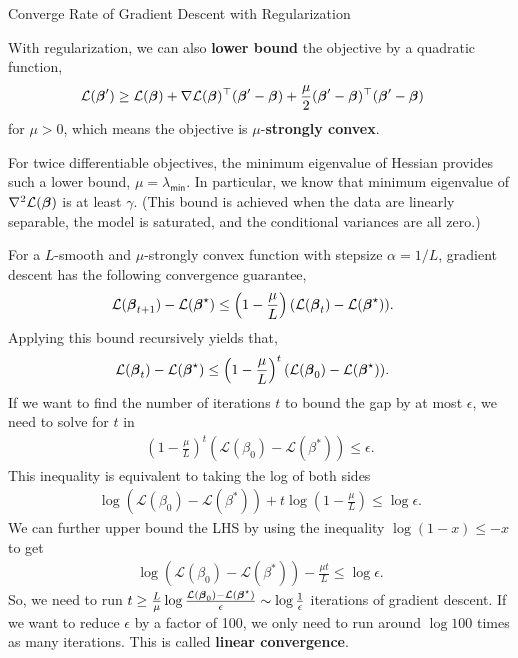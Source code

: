 \documentclass[aspectratio=169]{beamer}
\begin{document}
\begin{frame}[t,allowframebreaks]{Converge Rate of Gradient Descent with
Regularization}\label{converge-rate-of-gradient-descent-with-regularization}

With regularization, we can also \textbf{lower bound} the objective by a
quadratic function, \begin{align*}
\mathcal{L}(\boldsymbol{\beta}') &\geq \mathcal{L}(\boldsymbol{\beta}) + \nabla \mathcal{L}(\boldsymbol{\beta})^\top (\boldsymbol{\beta}' - \boldsymbol{\beta}) + \frac{\mu}{2} (\boldsymbol{\beta}' - \boldsymbol{\beta})^\top (\boldsymbol{\beta}' - \boldsymbol{\beta})
\end{align*} for \(\mu > 0\), which means the objective is
\(\mu\)-\textbf{strongly convex}.

For twice differentiable objectives, the minimum eigenvalue of Hessian
provides such a lower bound, \(\mu = \lambda_{\mathsf{min}}\). In
particular, we know that minimum eigenvalue of \(\nabla^2 \mathcal{L}(\boldsymbol{\beta})\)
is at least \(\gamma\). (This bound is achieved when the data are
linearly separable, the model is saturated, and the conditional
variances are all zero.)

For a \(L\)-smooth and \(\mu\)-strongly convex function with stepsize
\(\alpha = 1/L\), gradient descent has the following convergence
guarantee, \begin{align*}
\mathcal{L}(\boldsymbol{\beta}_{t+1}) - \mathcal{L}(\boldsymbol{\beta}^\star) &\leq \left(1 - \frac{\mu}{L} \right) (\mathcal{L}(\boldsymbol{\beta}_t) - \mathcal{L}(\boldsymbol{\beta}^\star)).
\end{align*} Applying this bound recursively yields that, \begin{align*}
\mathcal{L}(\boldsymbol{\beta}_t) - \mathcal{L}(\boldsymbol{\beta}^\star) &\leq \left(1 - \frac{\mu}{L} \right)^t (\mathcal{L}(\boldsymbol{\beta}_0) - \mathcal{L}(\boldsymbol{\beta}^\star)).
\end{align*} If we want to find the number of iterations \(t\) to bound
the gap by at most \(\epsilon\), we need to solve for \(t\) in
\begin{align*}
\left(1 - \frac{\mu}{L}\right)^t ( \mathcal L(\beta_0) - \mathcal L(\beta^*)) \leq \epsilon.
\end{align*} This inequality is equivalent to taking the log of both
sides \begin{align*}
    \log ( \mathcal L(\beta_0) - \mathcal L(\beta^*)) + t \log\left(1 - \frac{\mu}{L}\right) \leq \log \epsilon.
\end{align*} We can further upper bound the LHS by using the inequality
\(\log ( 1 - x) \leq -x\) to get \begin{align}
    \log ( \mathcal L(\beta_0) - \mathcal L(\beta^*))  - \frac{\mu t}{L}\leq \log \epsilon.
\end{align} So, we need to run
\(t \geq \frac{L}{\mu} \log \frac{\mathcal{L}(\boldsymbol{\beta}_0) - \mathcal{L}(\boldsymbol{\beta}^\star)}{\epsilon} \sim \log \frac{1}{\epsilon}\)
iterations of gradient descent. If we want to reduce \(\epsilon\) by a
factor of 100, we only need to run around \(\log 100\) times as many
iterations. This is called \textbf{linear convergence}.
\end{frame}
\end{document}
